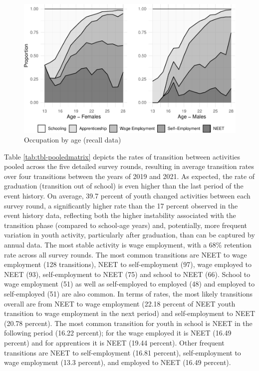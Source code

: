 \documentclass[
  11pt,
a4paper
]{article}
\begin{document}
\begin{figure}
\includegraphics{figures/fig-ageplot-1} \caption{Occupation by age (recall data)}\label{fig:fig-ageplot}
\end{figure}

Table \ref{tab:tbl-pooledmatrix} depicts the rates of transition between activities pooled across the five detailed survey rounds, resulting in average transition rates over four transitions between the years of 2019 and 2021. As expected, the rate of graduation (transition out of school) is even higher than the last period of the event history. On average, 39.7 percent of youth changed activities between each survey round, a significantly higher rate than the 17 percent observed in the event history data, reflecting both the higher instability associated with the transition phase (compared to school-age years) and, potentially, more frequent variation in youth activity, particularly after graduation, than can be captured by annual data. The most stable activity is wage employment, with a 68\% retention rate across all survey rounds. The most common transitions are NEET to wage employment (128 transitions), NEET to self-employment (97), wage employed to NEET (93), self-employment to NEET (75) and school to NEET (66). School to wage employment (51) as well as self-employed to employed (48) and employed to self-employed (51) are also common. In terms of rates, the most likely transitions overall are from NEET to wage employment (22.18 percent of NEET youth transition to wage employment in the next period) and self-employment to NEET (20.78 percent). The most common transition for youth in school is NEET in the following period (16.22 percent); for the wage employed it is NEET (16.49 percent) and for apprentices it is NEET (19.44 percent). Other frequent transitions are NEET to self-employment (16.81 percent), self-employment to wage employment (13.3 percent), and employed to NEET (16.49 percent).
\end{document}
